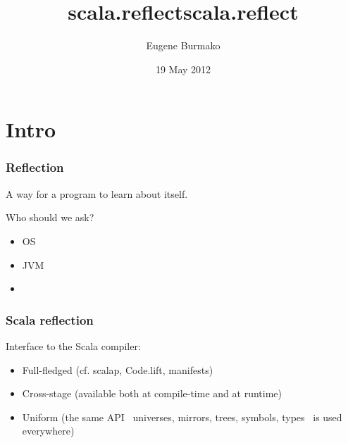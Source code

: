 \documentclass[hyperref={bookmarks=false}]{beamer}
\title{scala.reflect}
\begin{document}
\title{scala.reflect}
\author{Eugene Burmako}
\date{19 May 2012}
\maketitle

\section{Intro}

\begin{frame}[fragile]
\frametitle{Reflection}

A way for a program to learn about itself.

Who should we ask?

\begin{itemize}
\item OS
\item JVM
\item {}
\end{itemize}

\end{frame}

\begin{frame}[fragile]
\frametitle{Scala reflection}

Interface to the Scala compiler:

\begin{itemize}
\item Full-fledged (cf. scalap, Code.lift, manifests)
\item Cross-stage (available both at compile-time and at runtime)
\item Uniform (the same API \textendash\ universes, mirrors, trees, symbols, types \textendash\ is used everywhere)
\end{itemize}

\end{frame}
\end{document}
